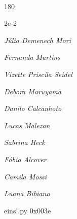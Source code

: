 \documentclass[12pt]{article}
\begin{document}
	\hfill	  	  


\pagebreak			

	\ 
	\vfill
	\begin{turn}{180}	
		\begin{minipage}{\textwidth}
		  	\ttfamily %
			\centering
			{\Huge 2e-2}
		  
			\hfill
		  
			

\textit{\small Júlia Demenech Mori}

\textit{\small Fernanda Martins}

\textit{\small Vizette Priscila Seidel}

\textit{\small Debora Maruyama}

\textit{\small Danilo Calcanhoto}

\textit{\small Lucas Malezan}

\textit{\small Sabrina Heck}

\textit{\small Fábio Alcover}

\textit{\small Camila Mossi}

\textit{\small Luana Bibiano}

\bigskip

eins!.py
0x003e


		\end{minipage}	
	\end{turn}
	\vfill
	\

\pagebreak
\end{document}
